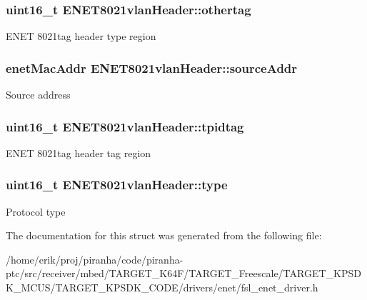 \subsubsection[{\texorpdfstring{othertag}{othertag}}]{\setlength{\rightskip}{0pt plus 5cm}uint16\+\_\+t E\+N\+E\+T8021vlan\+Header\+::othertag}\hypertarget{structENET8021vlanHeader_ac9f292148776ba1c490d6d37ce1c9fea}{}\label{structENET8021vlanHeader_ac9f292148776ba1c490d6d37ce1c9fea}
E\+N\+ET 8021tag header type region 
\subsubsection[{\texorpdfstring{source\+Addr}{sourceAddr}}]{\setlength{\rightskip}{0pt plus 5cm}enet\+Mac\+Addr E\+N\+E\+T8021vlan\+Header\+::source\+Addr}\hypertarget{structENET8021vlanHeader_a2b86de665d4a8c3f515048008752fe20}{}\label{structENET8021vlanHeader_a2b86de665d4a8c3f515048008752fe20}
Source address 
\subsubsection[{\texorpdfstring{tpidtag}{tpidtag}}]{\setlength{\rightskip}{0pt plus 5cm}uint16\+\_\+t E\+N\+E\+T8021vlan\+Header\+::tpidtag}\hypertarget{structENET8021vlanHeader_a46f7cbd3ac6c7ad498fa463368f4298d}{}\label{structENET8021vlanHeader_a46f7cbd3ac6c7ad498fa463368f4298d}
E\+N\+ET 8021tag header tag region 
\subsubsection[{\texorpdfstring{type}{type}}]{\setlength{\rightskip}{0pt plus 5cm}uint16\+\_\+t E\+N\+E\+T8021vlan\+Header\+::type}\hypertarget{structENET8021vlanHeader_a195bc7eacd87c3449ca0267513071c22}{}\label{structENET8021vlanHeader_a195bc7eacd87c3449ca0267513071c22}
Protocol type 

The documentation for this struct was generated from the following file\+:\begin{DoxyCompactItemize}
\item 
/home/erik/proj/piranha/code/piranha-\/ptc/src/receiver/mbed/\+T\+A\+R\+G\+E\+T\+\_\+\+K64\+F/\+T\+A\+R\+G\+E\+T\+\_\+\+Freescale/\+T\+A\+R\+G\+E\+T\+\_\+\+K\+P\+S\+D\+K\+\_\+\+M\+C\+U\+S/\+T\+A\+R\+G\+E\+T\+\_\+\+K\+P\+S\+D\+K\+\_\+\+C\+O\+D\+E/drivers/enet/fsl\+\_\+enet\+\_\+driver.\+h\end{DoxyCompactItemize}
